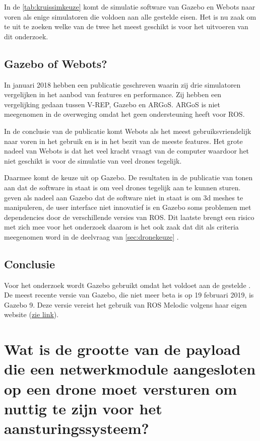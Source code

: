 \documentclass[a4paper, 11pt, oneside]{report}
\begin{document}
In de \autoref{tab:kruissimkeuze} komt de simulatie software van Gazebo en Webots naar voren als enige simulatoren die voldoen aan alle gestelde eisen.
Het is nu zaak om te uit te zoeken welke van de twee het meest geschikt is voor het uitvoeren van dit onderzoek.

\subsection{Gazebo of Webots?}
In januari 2018 hebben \citeauthor{RobotCompare} een publicatie geschreven waarin zij drie simulatoren vergelijken in het aanbod van features en performance. 
Zij hebben een vergelijking gedaan tussen V-REP, Gazebo en ARGoS. 
ARGoS is niet meegenomen in de overweging omdat het geen ondersteuning heeft voor ROS.

In de conclusie van de publicatie komt Webots als het meest gebruiksvriendelijk naar voren in het gebruik en is in het bezit van de meeste features.
Het grote nadeel van Webots is dat het veel kracht vraagt van de computer waardoor het niet geschikt is voor de simulatie van veel drones tegelijk.

Daarmee komt de keuze uit op Gazebo. 
De resultaten in de publicatie van  tonen aan dat de software in staat is om veel drones tegelijk aan te kunnen sturen.
 geven als nadeel aan Gazebo dat de software niet in staat is om 3d meshes te manipuleren, de user interface niet innovatief is en Gazebo soms problemen met dependencies door de verschillende versies van ROS.
Dit laatste brengt een risico met zich mee voor het onderzoek daarom is het ook zaak dat dit als criteria meegenomen word in de deelvraag van \autoref{sec:dronekeuze} . 

\subsection{Conclusie}
Voor het onderzoek wordt Gazebo gebruikt omdat het voldoet aan de gestelde .
De meest recente versie van Gazebo, die niet meer beta is op 19 februari 2019, is Gazebo 9.
Deze versie vereist het gebruik van ROS Melodic volgens haar eigen website  (\href{http://gazebosim.org/tutorials?tut=ros_wrapper_versions}{zie link}).

\section{Wat is de grootte van de payload die een netwerkmodule aangesloten op een drone moet versturen om nuttig te zijn voor het aansturingssysteem?}
\end{document}
